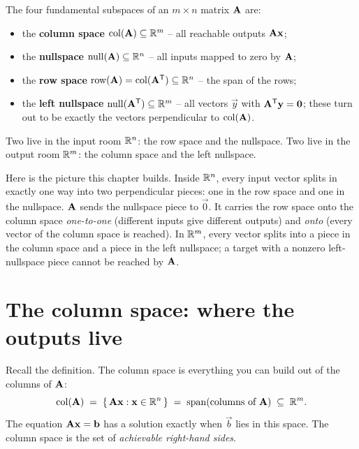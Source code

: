 \begin{focusbox}
The four fundamental subspaces of an $m \times n$ matrix $\mathbf{A}$ are:
\begin{itemize}
  \item the \textbf{column space} $\operatorname{col}(\mathbf{A}) \subseteq \mathbb{R}^m$ -- all reachable outputs $\mathbf{A}\mathbf{x}$;
  \item the \textbf{nullspace} $\operatorname{null}(\mathbf{A}) \subseteq \mathbb{R}^n$ -- all inputs mapped to zero by $\mathbf{A}$;
  \item the \textbf{row space} $\operatorname{row}(\mathbf{A}) = \operatorname{col}(\mathbf{A}^{\mathsf{T}}) \subseteq \mathbb{R}^n$ -- the span of the rows;
  \item the \textbf{left nullspace} $\operatorname{null}(\mathbf{A}^{\mathsf{T}}) \subseteq \mathbb{R}^m$ -- all vectors $\vec{y}$ with $\mathbf{A}^{\mathsf{T}}\mathbf{y}=\mathbf{0}$; these turn out to be exactly the vectors perpendicular to $\operatorname{col}(\mathbf{A})$.
\end{itemize}
Two live in the input room $\mathbb{R}^n$: the row space and the nullspace.
Two live in the output room $\mathbb{R}^m$: the column space and the left nullspace.
\end{focusbox}

\begin{intuitionbox}
Here is the picture this chapter builds. Inside $\mathbb{R}^n$, every input vector splits in
exactly one way into two perpendicular pieces: one in the row space and one in the
nullspace. $\mathbf{A}$ sends the nullspace piece to $\vec{0}$. It carries the row space
onto the column space \emph{one-to-one} (different inputs give different outputs) and
\emph{onto} (every vector of the column space is reached). In $\mathbb{R}^m$, every vector splits
into a piece in the column space and a piece in the left nullspace; a target with a
nonzero left-nullspace piece cannot be reached by $\mathbf{A}$.
\end{intuitionbox}

\section{The column space: where the outputs live}

Recall the definition. The column space is everything you can build out of the columns of
$\mathbf{A}$:
\[
  \operatorname{col}(\mathbf{A}) \;=\; \{\,\mathbf{A}\mathbf{x} : \mathbf{x}\in\mathbb{R}^n\,\}
  \;=\; \operatorname{span}(\text{columns of }\mathbf{A}) \;\subseteq\; \mathbb{R}^m.
\]
The equation $\mathbf{A}\mathbf{x}=\mathbf{b}$ has a solution exactly when $\vec{b}$ lies in this space.
The column space is the set of \emph{achievable right-hand sides}.

